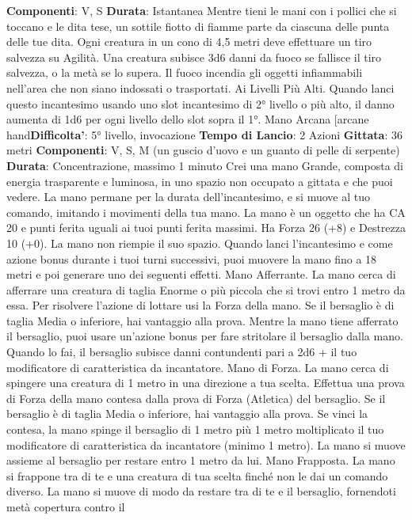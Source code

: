 \begin{multicols}{2}
\textbf{Componenti}: V, S
\textbf{Durata}: Istantanea
Mentre tieni le mani con i pollici che si toccano e le dita
tese, un sottile fiotto di fiamme parte da ciascuna delle
punta delle tue dita. Ogni creatura in un cono di 4,5
metri deve effettuare un tiro salvezza su Agilità.
Una creatura subisce 3d6 danni da fuoco se fallisce il
tiro salvezza, o la metà se lo supera.
Il fuoco incendia gli oggetti infiammabili nell’area che
non siano indossati o trasportati.
Ai Livelli Più Alti. Quando lanci questo incantesimo
usando uno slot incantesimo di 2° livello o più alto, il
danno aumenta di 1d6 per ogni livello dello slot sopra il
1°.
Mano Arcana
[arcane hand\textbf{Difficolta'}:
5° livello, invocazione
\textbf{Tempo di Lancio}: 2 Azioni
\textbf{Gittata}: 36 metri
\textbf{Componenti}: V, S, M (un guscio d’uovo e un guanto di
pelle di serpente)
\textbf{Durata}: Concentrazione, massimo 1 minuto
Crei una mano Grande, composta di energia
trasparente e luminosa, in uno spazio non occupato a
gittata e che puoi vedere. La mano permane per la
durata dell’incantesimo, e si muove al tuo comando,
imitando i movimenti della tua mano.
La mano è un oggetto che ha CA 20 e punti ferita uguali
ai tuoi punti ferita massimi. Ha Forza 26 (+8) e
Destrezza 10 (+0). La mano non riempie il suo spazio.
Quando lanci l’incantesimo e come azione bonus
durante i tuoi turni successivi, puoi muovere la mano
fino a 18 metri e poi generare uno dei seguenti effetti.
Mano Afferrante. La mano cerca di afferrare una
creatura di taglia Enorme o più piccola che si trovi entro 
1 metro da essa. Per risolvere l’azione di lottare usi la
Forza della mano. Se il bersaglio è di taglia Media o
inferiore, hai vantaggio alla prova. Mentre la mano tiene
afferrato il bersaglio, puoi usare un’azione bonus per
fare stritolare il bersaglio dalla mano. Quando lo fai, il
bersaglio subisce danni contundenti pari a 2d6 + il tuo
modificatore di caratteristica da incantatore.
Mano di Forza. La mano cerca di spingere una
creatura di 1 metro in una direzione a tua scelta.
Effettua una prova di Forza della mano contesa dalla
prova di Forza (Atletica) del bersaglio. Se il bersaglio è
di taglia Media o inferiore, hai vantaggio alla prova. Se
vinci la contesa, la mano spinge il bersaglio di 1 metro
più 1 metro moltiplicato il tuo modificatore di
caratteristica da incantatore (minimo 1 metro). La
mano si muove assieme al bersaglio per restare entro
1 metro da lui.
Mano Frapposta. La mano si frappone tra di te e una
creatura di tua scelta finché non le dai un comando
diverso. La mano si muove di modo da restare tra di te
e il bersaglio, fornendoti metà copertura contro il

\end{multicols}
